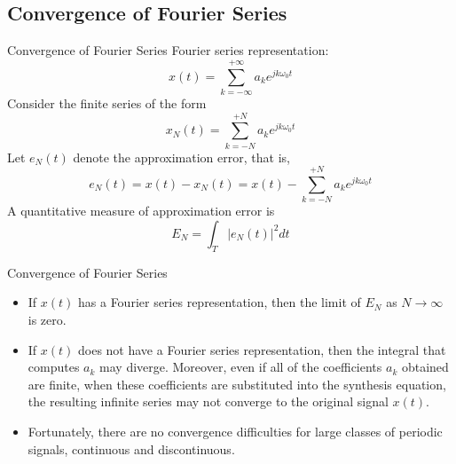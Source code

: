 \subsection{Convergence of Fourier Series}

\begin{frame}{Convergence of Fourier Series}
    Fourier series representation:
    \begin{equation*}
            x(t) = \sum_{k=-\infty}^{+\infty}a_k e^{jk\omega_0 t}
    \end{equation*}
    Consider the \alert{finite} series of the form
    \begin{equation*}
            x_N(t) = \sum_{k=-N}^{+N}a_k e^{jk\omega_0 t}
    \end{equation*}
    Let $e_N(t)$ denote the approximation error, that is,
    \begin{equation*}
            e_N(t) = x(t) - x_N(t) = x(t) - \sum_{k=-N}^{+N}a_k e^{jk\omega_0 t}
    \end{equation*}
    A quantitative measure of approximation error is
    \begin{equation*}
        E_N = \int_T \left|e_N(t)\right|^2 dt
    \end{equation*}


\end{frame}


\begin{frame}{Convergence of Fourier Series}
    \begin{itemize}[<+->]
        \item If $x(t)$ has a Fourier series representation, then the limit of $E_N$ as $N \rightarrow \infty$ is zero.
        \item If $x(t)$ does not have a Fourier series representation, then the integral that computes $a_k$ may diverge. Moreover, even if all of the coefficients $a_k$ obtained  are finite, when these coefficients are substituted into the synthesis equation, the resulting infinite series may not converge to the original signal $x(t)$.
        \item Fortunately, there are no convergence difficulties for large classes of periodic signals, continuous and discontinuous.
    \end{itemize}


\end{frame}


